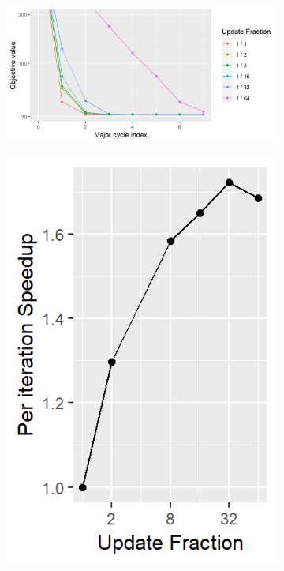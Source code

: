 \begin{figure}[h]
	\centering
	\begin{subfigure}[b]{0.58\linewidth}
		\includegraphics[width=\linewidth]{./chapters/10.results/gradient/ApproxUpdate/size.png}
	\end{subfigure}
	\begin{subfigure}[b]{0.195\linewidth}
		\includegraphics[width=\linewidth]{./chapters/10.results/gradient/ApproxUpdate/speedup_iter.png}

\end{subfigure}
\end{figure}
